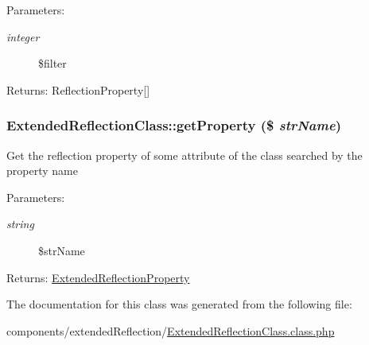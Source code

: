 \begin{Desc}
\item[Parameters:]
\begin{description}
\item[{\em integer}]\$filter \end{description}
\end{Desc}
\begin{Desc}
\item[Returns:]ReflectionProperty\mbox{[}\mbox{]} \end{Desc}
\hypertarget{class_extended_reflection_class_5c58929a1f0a44664ba38d4c05d1cd47}{
\subsubsection[{getProperty}]{\setlength{\rightskip}{0pt plus 5cm}ExtendedReflectionClass::getProperty (\$ {\em strName})}}
\label{class_extended_reflection_class_5c58929a1f0a44664ba38d4c05d1cd47}


Get the reflection property of some attribute of the class searched by the property name

\begin{Desc}
\item[Parameters:]
\begin{description}
\item[{\em string}]\$strName \end{description}
\end{Desc}
\begin{Desc}
\item[Returns:]\hyperlink{class_extended_reflection_property}{ExtendedReflectionProperty} \end{Desc}


The documentation for this class was generated from the following file:\begin{CompactItemize}
\item 
components/extendedReflection/\hyperlink{_extended_reflection_class_8class_8php}{ExtendedReflectionClass.class.php}\end{CompactItemize}
